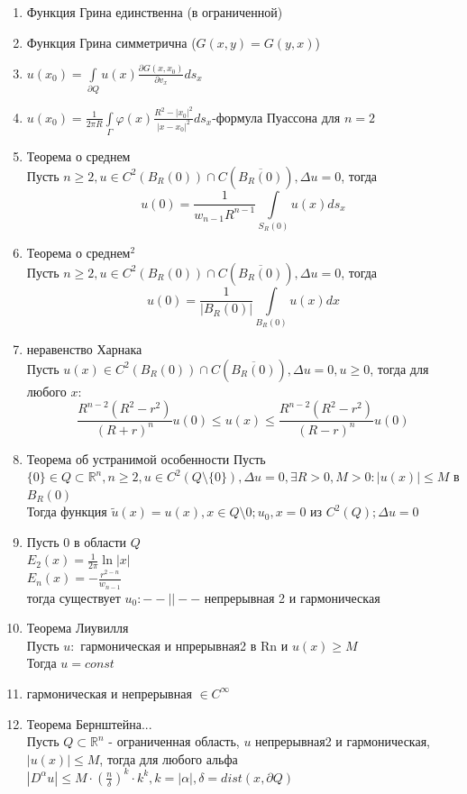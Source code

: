 \documentclass[a4paper,12pt]{article}
\newcommand {\pp} {\partial}
\newcommand {\FI} {\varphi}
\newcommand {\iii} {\int\limits}
\newcommand {\AL} {\alpha}
\begin{document}
\begin{enumerate}
\item Функция Грина единственна (в ограниченной)
\item Функция Грина симметрична ($G(x,y) = G(y,x)$)
\item $u(x_0) = \iii_{\pp Q} u(x) \frac{\pp G(x,x_0)}{\pp v_x}ds_x$
\item $u(x_0) = \frac{1}{2\pi R}\iii_\Gamma\FI(x) \frac{R^2-|x_0|^2}{|x-x_0|^2}ds_x$-формула Пуассона для $n=2$
\item Теорема о среднем\\
Пусть $n\ge 2, u\in C^2(B_R(0))\cap C(\overline{B_R(0)}), \Delta u=0$, тогда $$u(0)=\frac{1}{w_{n-1}R^{n-1}}\iii_{S_R(0)}u(x)ds_x$$
\item Теорема о среднем$^2$\\
Пусть $n\ge 2, u\in C^2(B_R(0))\cap C(\overline{B_R(0)}), \Delta u=0$, тогда $$u(0)=\frac{1}{|B_R(0)|}\iii_{B_R(0)}u(x)dx$$
\item неравенство Харнака\\
Пусть $u(x)\in C^2(B_R(0))\cap C(\overline{B_R(0)}), \Delta u =0, u\ge 0$, тогда для любого $x$:
$$\frac{R^{n-2}(R^2-r^2)}{(R+r)^n}u(0) \le u(x)\le\frac{R^{n-2}(R^2-r^2)}{(R-r)^n}u(0)$$
\item Теорема об устранимой особенности
Пусть $\{0\}\in Q\subset \mathbb{R}^n, n\ge2, u\in C^2(Q\setminus\{0\}), \Delta u = 0, \exists R>0, M>0: |u(x)| \le M$ в $B_R(0)$\\
Тогда функция $\widetilde{u}(x) = u(x), x \in Q\setminus 0; u_0, x=0$ из $C^2(Q); \Delta u = 0$
\item Пусть 0 в области $Q$\\
$E_2(x) = \frac{1}{2\pi}\ln|x|$\\
$E_n(x) = -\frac{r^{2-n}}{w_{n-1}}$\\
тогда существует $u_0: --||--$ непрерывная 2 и гармоническая
\item Теорема Лиувилля\\
Пусть $u:$ гармоническая и нпрерывная2 в Rn и $u(x) \ge M$\\
Тогда $u=const$
\item гармоническая и непрерывная $\in C^\infty$
\item Теорема Бернштейна...\\
Пусть $Q\subset \mathbb{R}^n$ - ограниченная область, $u$ непрерывная2 и гармоническая, $|u(x)|\le M$, тогда для любого альфа\\
$|D^\alpha u| \le M \cdot \left(\frac{n}{\delta}\right)^k \cdot k^k, k = |\AL|, \delta = dist(x,\pp Q)$


\end{enumerate}
\end{document}
